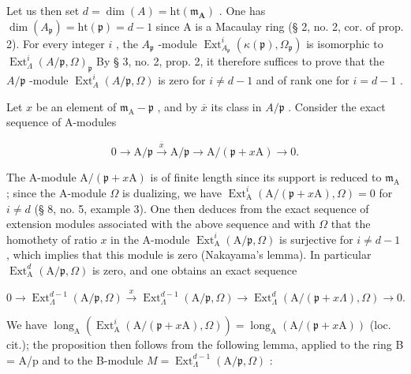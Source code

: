 Let us then set \(d = \dim(A) = \mathrm{ht}(\mathfrak{m}_{\mathbf{A}})\) . One has \(\dim(A_{\mathfrak{p}}) = \mathrm{ht}(\mathfrak{p}) = d - 1\) since A is a Macaulay ring (§ 2, no. 2, cor. of prop. 2). For every integer \(i\) , the \(A_{\mathfrak{p}}\) -module \(\operatorname{Ext}_{A_{\mathfrak{p}}}^{i}(\kappa(\mathfrak{p}), \Omega_{\mathfrak{p}})\) is isomorphic to \(\operatorname{Ext}_{\Lambda}^{i}(A/\mathfrak{p}, \Omega)_{\mathfrak{p}}\) By § 3, no. 2, prop. 2, it therefore suffices to prove that the \(A/\mathfrak{p}\) -module \(\operatorname{Ext}_{A}^{i}(A/\mathfrak{p}, \Omega)\) is zero for \(i \neq d - 1\) and of rank one for \(i = d - 1\) .

Let \(x\) be an element of \(\mathfrak{m}_{\mathrm{A}} - \mathfrak{p}\) , and by \(\overline{x}\) its class in \(A / \mathfrak{p}\) . Consider the exact sequence of A-modules

\[
0 \rightarrow \mathrm{A} / \mathfrak {p} \xrightarrow {\overline {{{x}}}} \mathrm{A} / \mathfrak {p} \longrightarrow \mathrm{A} / (\mathfrak {p} + x \mathrm{A}) \rightarrow 0.
\]

The A-module \(\mathrm{A} / (\mathfrak{p} + x\mathrm{A})\) is of finite length since its support is reduced to \(\mathfrak{m}_{\mathrm{A}}\) ; since the A-module \(\Omega\) is dualizing, we have \(\operatorname{Ext}_{\mathrm{A}}^{i}(\mathrm{A} / (\mathfrak{p} + x\mathrm{A}), \Omega) = 0\) for \(i \neq d\) (§ 8, no. 5, example 3). One then deduces from the exact sequence of extension modules associated with the above sequence and with \(\Omega\) that the homothety of ratio \(x\) in the A-module \(\operatorname{Ext}_{\mathrm{A}}^{i}(\mathrm{A} / \mathfrak{p}, \Omega)\) is surjective for \(i \neq d - 1\) , which implies that this module is zero (Nakayama's lemma). In particular \(\operatorname{Ext}_{\mathrm{A}}^{d}(\mathrm{A} / \mathfrak{p}, \Omega)\) is zero, and one obtains an exact sequence

\[
0 \rightarrow \operatorname{Ext} _ {\Lambda} ^ {d - 1} (\mathrm{A} / \mathfrak {p}, \Omega) \xrightarrow {x} \operatorname{Ext} _ {\Lambda} ^ {d - 1} (\mathrm{A} / \mathfrak {p}, \Omega) \longrightarrow \operatorname{Ext} _ {\Lambda} ^ {d} (\mathrm{A} / (\mathfrak {p} + x \Lambda), \Omega) \rightarrow 0.
\]

We have \(\operatorname{long}_{\mathrm{A}}(\operatorname{Ext}_{\mathrm{A}}^{i}(\mathrm{A}/(\mathfrak{p}+x\mathrm{A}),\Omega))=\operatorname{long}_{\mathrm{A}}(\mathrm{A}/(\mathfrak{p}+x\mathrm{A}))\) (loc. cit.); the proposition then follows from the following lemma, applied to the ring B = A/p and to the B-module \(M=\operatorname{Ext}_{\Lambda}^{d-1}(\mathrm{A}/\mathfrak{p},\Omega)\) :

